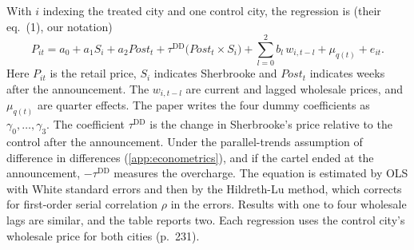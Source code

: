 With $i$ indexing the treated city and one control city, the regression is (their eq.~(1), our notation)
\begin{equation}\label{eq:13-eh-did}
P_{it}=a_0+a_1S_i+a_2\textit{Post}_t+\tau^{\mathrm{DD}}\big(\textit{Post}_t\times S_i\big)+\sum_{l=0}^{2}b_l\,w_{i,t-l}+\mu_{q(t)}+e_{it}.
\end{equation}
Here $P_{it}$ is the retail price, $S_i$ indicates Sherbrooke and $\textit{Post}_t$ indicates weeks after the announcement. The
$w_{i,t-l}$ are current and lagged wholesale prices, and $\mu_{q(t)}$ are quarter effects. The paper writes the four dummy coefficients as
$\gamma_0,\dots,\gamma_3$. The coefficient $\tau^{\mathrm{DD}}$ is the change in Sherbrooke's price relative to the control after the
announcement. Under the parallel-trends assumption of difference in differences (\cref{app:econometrics}), and if the cartel ended at the
announcement, $-\tau^{\mathrm{DD}}$ measures the overcharge. The equation is estimated by OLS with White standard errors and then by the
Hildreth-Lu method, which corrects for first-order serial correlation $\rho$ in the errors. Results with one to four wholesale lags are
similar, and the table reports two. Each regression uses the control city's wholesale price for both cities (p.~231).

